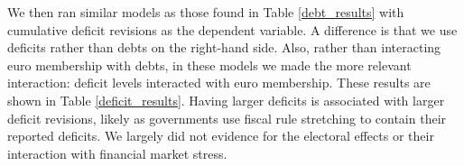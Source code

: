 \documentclass[]{article}
\begin{document}
We then ran similar models as those found in Table \ref{debt_results} with cumulative deficit revisions as the dependent variable. A difference is that we use deficits rather than debts on the right-hand side. Also, rather than interacting euro membership with debts, in these models we made the more relevant interaction: deficit levels interacted with euro membership. These results are shown in Table \ref{deficit_results}. Having larger deficits is associated with larger deficit revisions, likely as governments use fiscal rule stretching to contain their reported deficits. We largely did not evidence for the electoral effects or their interaction with financial market stress.

\begin{landscape}
    
\end{landscape}
\end{document}
